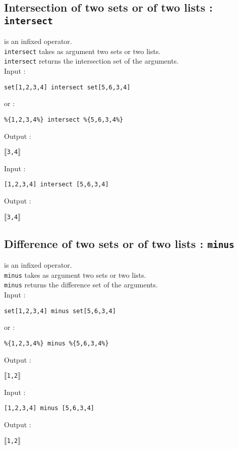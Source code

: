 \documentclass[a4paper,11pt]{book}
\begin{document}
\subsection{Intersection of two sets or of two lists : {\tt intersect}}
 is an infixed operator.\\
{\tt intersect} takes as argument two sets or two lists.\\
{\tt intersect} returns the intersection set of the arguments.\\
Input :
\begin{center}{\tt set[1,2,3,4] intersect set[5,6,3,4]}\end{center}
or :
\begin{center}{\tt \%\{1,2,3,4\%\} intersect \%\{5,6,3,4\%\}}\end{center}
Output :
\begin{center}{\tt $\llbracket$3,4$\rrbracket$}\end{center}
Input :
\begin{center}{\tt [1,2,3,4] intersect [5,6,3,4]}\end{center}
Output :
\begin{center}{\tt $\llbracket$3,4$\rrbracket$}\end{center}

\subsection{Difference of two sets or of two lists : {\tt minus}}
 is an infixed operator.\\
{\tt minus}  takes as argument two sets or two lists.\\
{\tt minus} returns the difference set of the arguments.\\
Input :
\begin{center}{\tt set[1,2,3,4] minus set[5,6,3,4]}\end{center}
or :
\begin{center}{\tt \%\{1,2,3,4\%\} minus \%\{5,6,3,4\%\}}\end{center}
Output :
\begin{center}{\tt $\llbracket$1,2$\rrbracket$}\end{center}
Input :
\begin{center}{\tt [1,2,3,4] minus [5,6,3,4]}\end{center}
Output :
\begin{center}{\tt $\llbracket$1,2$\rrbracket$}\end{center}
\end{document}
